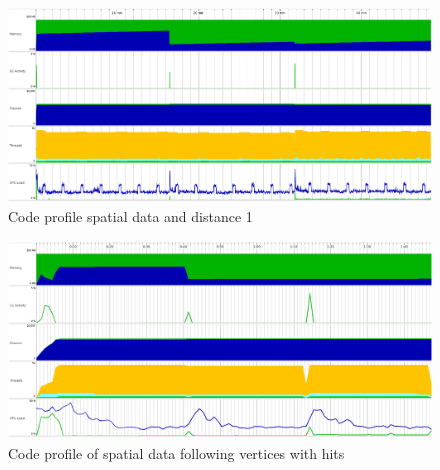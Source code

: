 \begin{figure}
	\centering
	\includegraphics[scale=0.245]{figs/profile1.png}
	\caption{Code profile spatial data and distance 1}
	\label{fig:profile1}
\end{figure}
%
\begin{figure}
	\centering
	\includegraphics[scale=0.245]{figs/profileHits.png}
	\caption{Code profile of spatial data following vertices with hits}
	\label{fig:profileFollow}
\end{figure}
\FloatBarrier

